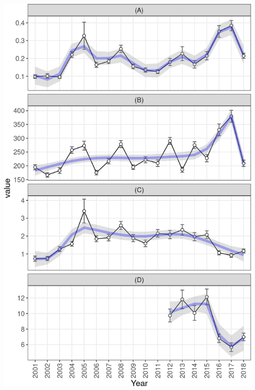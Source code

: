 \documentclass[10pt,landscape,a3paper]{article}
\begin{document}
\begin{center}\includegraphics{img/modelling/aa-eda-ts-7} \end{center}
\end{document}
